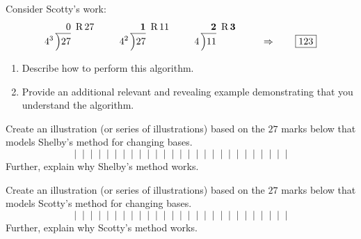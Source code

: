 \begin{prob} Consider Scotty's work:
\[
4^3\,\begin{tabular}[b]{@{}r@{} r}
$0$ &\, R\,$27$\\ \cline{1-1}
\Big)\begin{tabular}[t]{@{}l@{}}
$27$ 
\end{tabular}
\end{tabular}
\qquad
4^2\,\begin{tabular}[b]{@{}r@{} r}
$\boldsymbol{1}$ &\, R\,$11$\\ \cline{1-1}
\Big)\begin{tabular}[t]{@{}l@{}}
$27$ 
\end{tabular}
\end{tabular}
\qquad
4\,\begin{tabular}[b]{@{}r@{} r}
$\boldsymbol{2}$ &\, R\,$\boldsymbol{3}$\\ \cline{1-1}
\Big)\begin{tabular}[t]{@{}l@{}}
$11$ 
\end{tabular}
\end{tabular} \qquad \Rightarrow \qquad \fbox{$123$}
\]
\begin{enumerate}
\item Describe how to perform this algorithm.
\item Provide an additional relevant and revealing example
  demonstrating that you understand the algorithm.
\end{enumerate}
\end{prob}

\begin{prob} 
Create an illustration (or series of illustrations) based on the $27$
marks below that models Shelby's method for changing bases.
\[
|\;\;|\;\;|\;\;|\;\;|\;\;|\;\;|\;\;|\;\;|\;\;|\;\;|\;\;|\;\;|\;\;|\;\;|\;\;|\;\;|\;\;|\;\;|\;\;|\;\;|\;\;|\;\;|\;\;|\;\;|\;\;|\;\;|
\]
Further, explain why Shelby's method works. 
\end{prob}

\begin{prob} 
Create an illustration (or series of illustrations) based on the $27$
marks below that models Scotty's method for changing bases.
\[
|\;\;|\;\;|\;\;|\;\;|\;\;|\;\;|\;\;|\;\;|\;\;|\;\;|\;\;|\;\;|\;\;|\;\;|\;\;|\;\;|\;\;|\;\;|\;\;|\;\;|\;\;|\;\;|\;\;|\;\;|\;\;|\;\;|
\]
Further, explain why Scotty's method works. 
\end{prob}
